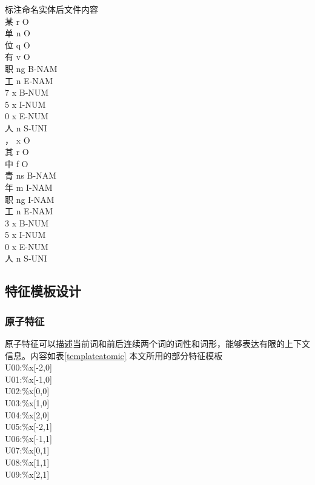 {标注命名实体后文件内容\\}
{
某 r O\\
单 n O\\
位 q O\\
有 v O\\
职 ng B-NAM\\
工 n E-NAM\\
7 x B-NUM\\
5 x I-NUM\\
0 x E-NUM\\
人 n S-UNI\\
， x O\\
其 r O\\
中 f O\\
青 ns B-NAM\\
年 m I-NAM\\
职 ng I-NAM\\
工 n E-NAM\\
3 x B-NUM\\
5 x I-NUM\\
0 x E-NUM\\
人 n S-UNI\\
}
{
}

\subsection{特征模板设计}
\subsubsection{原子特征}
原子特征可以描述当前词和前后连续两个词的词性和词形，能够表达有限的上下文信息。内容如表\ref{templateatomic}
{本文所用的部分特征模板\\}
{
U00:\%x[-2,0]\\
U01:\%x[-1,0]\\
U02:\%x[0,0]\\
U03:\%x[1,0]\\
U04:\%x[2,0]\\
U05:\%x[-2,1]\\
U06:\%x[-1,1]\\
U07:\%x[0,1]\\
U08:\%x[1,1]\\
U09:\%x[2,1]\\
}
{
}

